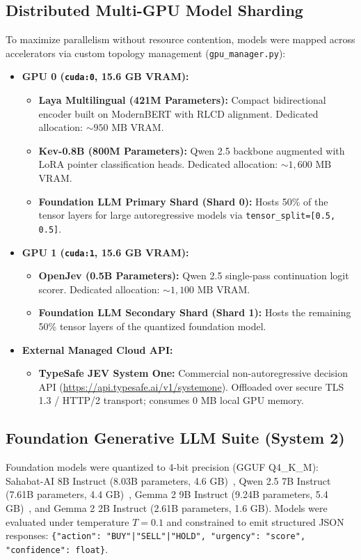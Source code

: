 \documentclass[journal,compsoc]{IEEEtran}
\begin{document}
\subsection{Distributed Multi-GPU Model Sharding}
To maximize parallelism without resource contention, models were mapped across accelerators via custom topology management (\texttt{gpu\_manager.py}):
\begin{itemize}
    \item \textbf{GPU 0 (\texttt{cuda:0}, 15.6 GB VRAM):}
    \begin{itemize}
        \item \textbf{Laya Multilingual (421M Parameters):} Compact bidirectional encoder built on ModernBERT with RLCD alignment. Dedicated allocation: $\sim 950 \text{ MB}$ VRAM.
        \item \textbf{Kev-0.8B (800M Parameters):} Qwen 2.5 backbone augmented with LoRA pointer classification heads. Dedicated allocation: $\sim 1,600 \text{ MB}$ VRAM.
        \item \textbf{Foundation LLM Primary Shard (Shard 0):} Hosts 50\% of the tensor layers for large autoregressive models via \texttt{tensor\_split=[0.5, 0.5]}.
    \end{itemize}
    \item \textbf{GPU 1 (\texttt{cuda:1}, 15.6 GB VRAM):}
    \begin{itemize}
        \item \textbf{OpenJev (0.5B Parameters):} Qwen 2.5 single-pass continuation logit scorer. Dedicated allocation: $\sim 1,100 \text{ MB}$ VRAM.
        \item \textbf{Foundation LLM Secondary Shard (Shard 1):} Hosts the remaining 50\% tensor layers of the quantized foundation model.
    \end{itemize}
    \item \textbf{External Managed Cloud API:}
    \begin{itemize}
        \item \textbf{TypeSafe JEV System One:} Commercial non-autoregressive decision API (\url{https://api.typesafe.ai/v1/systemone}). Offloaded over secure TLS 1.3 / HTTP/2 transport; consumes 0 MB local GPU memory.
    \end{itemize}
\end{itemize}

\subsection{Foundation Generative LLM Suite (System 2)}
Foundation models were quantized to 4-bit precision (GGUF Q4\_K\_M): Sahabat-AI 8B Instruct (8.03B parameters, 4.6 GB)~\cite{sahabatai2024}, Qwen 2.5 7B Instruct (7.61B parameters, 4.4 GB)~\cite{qwen2024}, Gemma 2 9B Instruct (9.24B parameters, 5.4 GB)~\cite{gemma2024}, and Gemma 2 2B Instruct (2.61B parameters, 1.6 GB). Models were evaluated under temperature $T=0.1$ and constrained to emit structured JSON responses: \texttt{\{"action": "BUY"|"SELL"|"HOLD", "urgency": "score", "confidence": float\}}.
\end{document}
